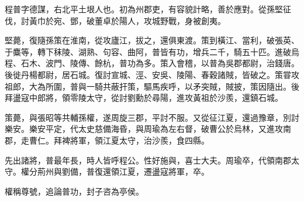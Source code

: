 \begin{pinyinscope}
 
 
 程普字德謀，右北平土垠人也。初為州郡吏，有容貌計略，善於應對。從孫堅征伐，討黃巾於宛、鄧，破董卓於陽人，攻城野戰，身被創夷。
 
 
 
 
 堅薨，復隨孫策在淮南，從攻廬江，拔之，還俱東渡。策到橫江、當利，破張英、于麋等，轉下秣陵、湖熟、句容、曲阿，普皆有功，增兵二千，騎五十匹。進破烏程、石木、波門、陵傳、餘杭，普功為多。策入會稽，以普為吳郡都尉，治錢唐。後徙丹楊都尉，居石城。復討宣城、涇、安吳、陵陽、春穀諸賊，皆破之。策甞攻祖郎，大為所圍，普與一騎共蔽扞策，驅馬疾呼，以矛突賊，賊披，策因隨出。後拜盪寇中郎將，領零陵太守，從討劉勳於尋陽，進攻黃祖於沙羨，還鎮石城。
 
 
 
 
 策薨，與張昭等共輔孫權，遂周旋三郡，平討不服。又從征江夏，還過豫章，別討樂安。樂安平定，代太史慈備海昏，與周瑜為左右督，破曹公於烏林，又進攻南郡，走曹仁。拜裨將軍，領江夏太守，治沙羨，食四縣。
 
 
 
 
 先出諸將，普最年長，時人皆呼程公。性好施與，喜士大夫。周瑜卒，代領南郡太守。權分荊州與劉備，普復還領江夏，遷盪寇將軍，卒。
 
 
 權稱尊號，追論普功，封子咨為亭侯。
 
 
\end{pinyinscope}